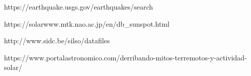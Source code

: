 https://earthquake.usgs.gov/earthquakes/search

https://solarwww.mtk.nao.ac.jp/en/db_sunspot.html

http://www.sidc.be/silso/datafiles

https://www.portalastronomico.com/derribando-mitos-terremotos-y-actividad-solar/
